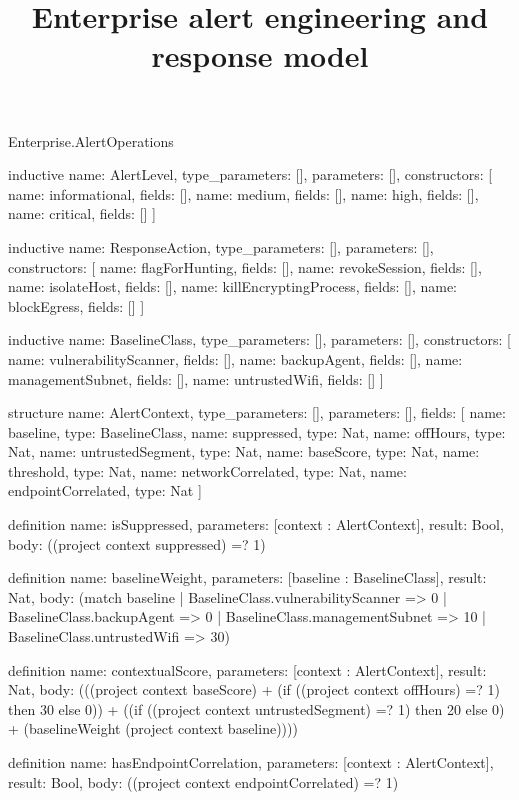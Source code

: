 \begin{lexlean}{Enterprise.AlertOperations}
\title{Enterprise alert engineering and response model}
\begin{semanticmodule}
inductive{
  name: AlertLevel,
  type_parameters: [],
  parameters: [],
  constructors: [
    {name: informational, fields: []},
    {name: medium, fields: []},
    {name: high, fields: []},
    {name: critical, fields: []}
  ]
}

inductive{
  name: ResponseAction,
  type_parameters: [],
  parameters: [],
  constructors: [
    {name: flagForHunting, fields: []},
    {name: revokeSession, fields: []},
    {name: isolateHost, fields: []},
    {name: killEncryptingProcess, fields: []},
    {name: blockEgress, fields: []}
  ]
}

inductive{
  name: BaselineClass,
  type_parameters: [],
  parameters: [],
  constructors: [
    {name: vulnerabilityScanner, fields: []},
    {name: backupAgent, fields: []},
    {name: managementSubnet, fields: []},
    {name: untrustedWifi, fields: []}
  ]
}

structure{
  name: AlertContext,
  type_parameters: [],
  parameters: [],
  fields: [
    {name: baseline, type: BaselineClass},
    {name: suppressed, type: Nat},
    {name: offHours, type: Nat},
    {name: untrustedSegment, type: Nat},
    {name: baseScore, type: Nat},
    {name: threshold, type: Nat},
    {name: networkCorrelated, type: Nat},
    {name: endpointCorrelated, type: Nat}
  ]
}

definition{
  name: isSuppressed,
  parameters: [context : AlertContext],
  result: Bool,
  body: ((project context suppressed) =? 1)
}

definition{
  name: baselineWeight,
  parameters: [baseline : BaselineClass],
  result: Nat,
  body: (match baseline
    | BaselineClass.vulnerabilityScanner => 0
    | BaselineClass.backupAgent => 0
    | BaselineClass.managementSubnet => 10
    | BaselineClass.untrustedWifi => 30)
}

definition{
  name: contextualScore,
  parameters: [context : AlertContext],
  result: Nat,
  body: (((project context baseScore) + (if ((project context offHours) =? 1) then 30 else 0)) + ((if ((project context untrustedSegment) =? 1) then 20 else 0) + (baselineWeight (project context baseline))))
}

definition{
  name: hasEndpointCorrelation,
  parameters: [context : AlertContext],
  result: Bool,
  body: ((project context endpointCorrelated) =? 1)
}


\end{semanticmodule}
\end{lexlean}
